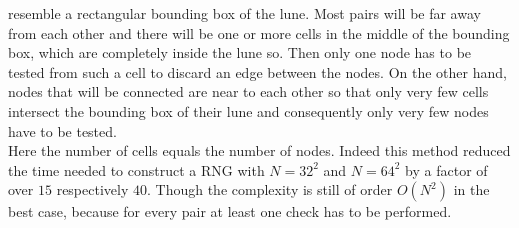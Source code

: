     resemble a rectangular bounding box of the lune. Most pairs will be
    far away from each other and there will be one or more cells in the
    middle of the bounding box, which are completely inside the lune so.
    Then only one node has to be tested from such a cell to discard an
    edge between the nodes. On the other hand, nodes that will be connected
    are near to each other so that only very few cells intersect the bounding
    box of their lune and consequently only very few nodes have to be tested.\\
    Here the number of cells equals the number of nodes.
    Indeed this method reduced the time needed to construct a RNG with
    \(N=32^2\) and \(N=64^2\) by a factor of
    over \(15\) respectively \(40\). Though the complexity is still of
    order \(O(N^2)\) in the best case, because for every pair at least
    one check has to be performed.
